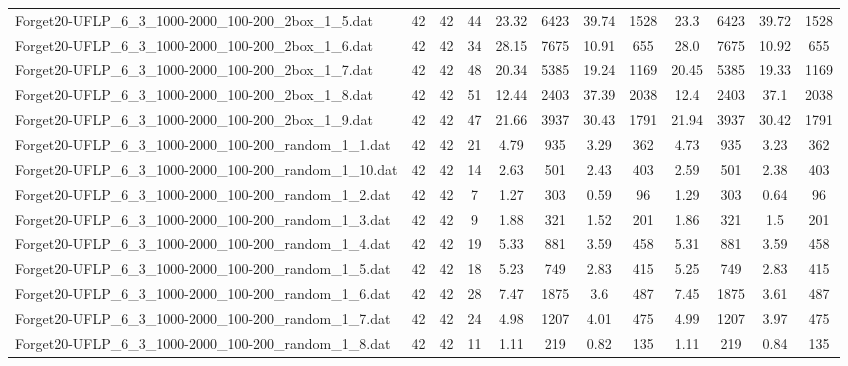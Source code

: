 \begin{sidewaystable}[!ht]
{\begin{tabular}{lccccccccccc}
Forget20-UFLP\_6\_3\_1000-2000\_100-200\_2box\_1\_5.dat & 42 & 42 & 44 & 23.32 & 6423 & 39.74 & 1528 & 23.3 & 6423 & 39.72 & 1528 \\
Forget20-UFLP\_6\_3\_1000-2000\_100-200\_2box\_1\_6.dat & 42 & 42 & 34 & 28.15 & 7675 &  \textcolor{blue2}{10.91} & 655 & 28.0 & 7675 & 10.92 & 655 \\
Forget20-UFLP\_6\_3\_1000-2000\_100-200\_2box\_1\_7.dat & 42 & 42 & 48 & 20.34 & 5385 &  \textcolor{blue2}{19.24} & 1169 & 20.45 & 5385 & 19.33 & 1169 \\
Forget20-UFLP\_6\_3\_1000-2000\_100-200\_2box\_1\_8.dat & 42 & 42 & 51 & 12.44 & 2403 & 37.39 & 2038 & 12.4 & 2403 & 37.1 & 2038 \\
Forget20-UFLP\_6\_3\_1000-2000\_100-200\_2box\_1\_9.dat & 42 & 42 & 47 & 21.66 & 3937 & 30.43 & 1791 & 21.94 & 3937 & 30.42 & 1791 \\
Forget20-UFLP\_6\_3\_1000-2000\_100-200\_random\_1\_1.dat & 42 & 42 & 21 & 4.79 & 935 & 3.29 & 362 & 4.73 & 935 &  \textcolor{blue2}{3.23} & 362 \\
Forget20-UFLP\_6\_3\_1000-2000\_100-200\_random\_1\_10.dat & 42 & 42 & 14 & 2.63 & 501 & 2.43 & 403 & 2.59 & 501 &  \textcolor{blue2}{2.38} & 403 \\
Forget20-UFLP\_6\_3\_1000-2000\_100-200\_random\_1\_2.dat & 42 & 42 & 7 & 1.27 & 303 & 0.59 & 96 & 1.29 & 303 & 0.64 & 96 \\
Forget20-UFLP\_6\_3\_1000-2000\_100-200\_random\_1\_3.dat & 42 & 42 & 9 & 1.88 & 321 & 1.52 & 201 & 1.86 & 321 &  \textcolor{blue2}{1.5} & 201 \\
Forget20-UFLP\_6\_3\_1000-2000\_100-200\_random\_1\_4.dat & 42 & 42 & 19 & 5.33 & 881 &  \textcolor{blue2}{3.59} & 458 & 5.31 & 881 &  \textcolor{blue2}{3.59} & 458 \\
Forget20-UFLP\_6\_3\_1000-2000\_100-200\_random\_1\_5.dat & 42 & 42 & 18 & 5.23 & 749 &  \textcolor{blue2}{2.83} & 415 & 5.25 & 749 &  \textcolor{blue2}{2.83} & 415 \\
Forget20-UFLP\_6\_3\_1000-2000\_100-200\_random\_1\_6.dat & 42 & 42 & 28 & 7.47 & 1875 &  \textcolor{blue2}{3.6} & 487 & 7.45 & 1875 & 3.61 & 487 \\
Forget20-UFLP\_6\_3\_1000-2000\_100-200\_random\_1\_7.dat & 42 & 42 & 24 & 4.98 & 1207 & 4.01 & 475 & 4.99 & 1207 &  \textcolor{blue2}{3.97} & 475 \\
Forget20-UFLP\_6\_3\_1000-2000\_100-200\_random\_1\_8.dat & 42 & 42 & 11 & 1.11 & 219 &  \textcolor{blue2}{0.82} & 135 & 1.11 & 219 & 0.84 & 135 \\

\end{tabular}}
\end{sidewaystable}
